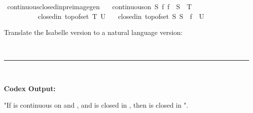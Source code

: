 \documentclass{article}
\begin{document}
\begin{boxB}
\begin{isabelle}
\isamarkupfalse \ continuous{\isacharunderscore}{\kern0pt}closedin{\isacharunderscore}{\kern0pt}preimage{\isacharunderscore}{\kern0pt}gen{\isacharcolon}{\kern0pt}\isanewline
\ \ \ {\isachardoublequoteopen}continuous{\isacharunderscore}{\kern0pt}on\ S\ f{\isachardoublequoteclose}\ {\isachardoublequoteopen}f\ {\isacharbackquote}{\kern0pt}\ S\ {\isasymsubseteq}\ T{\isachardoublequoteclose}\ \isanewline
\ \ \ \ \ \ \ \ \ \ {\isachardoublequoteopen}closedin\ {\isacharparenleft}{\kern0pt}top{\isacharunderscore}{\kern0pt}of{\isacharunderscore}{\kern0pt}set\ T{\isacharparenright}{\kern0pt}\ U{\isachardoublequoteclose}\isanewline
\ \ \ {\isachardoublequoteopen}closedin\ {\isacharparenleft}{\kern0pt}top{\isacharunderscore}{\kern0pt}of{\isacharunderscore}{\kern0pt}set\ S{\isacharparenright}{\kern0pt}\ {\isacharparenleft}{\kern0pt}S\ {\isasyminter}\ f\ {\isacharminus}{\kern0pt}{\isacharbackquote}{\kern0pt}\ U{\isacharparenright}{\kern0pt}{\isachardoublequoteclose}\isanewline

\end{isabelle}
Translate the Isabelle version to a natural language version:

\
\hrule
\

\textbf{Codex Output:}

"If  is continuous on  and , and  is closed in , then  is closed in ".
\end{boxB}
\end{document}
